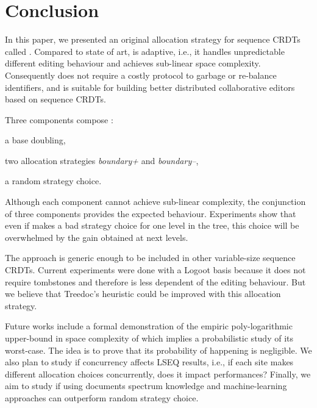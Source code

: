 \section{Conclusion}

In this paper, we presented an original allocation strategy for sequence CRDTs
called \NAME{}. Compared to state of art, \NAME{} is adaptive, i.e., it handles
unpredictable different editing behaviour and achieves sub-linear space
complexity. Consequently \NAME{} does not require a costly protocol to garbage
or re-balance identifiers, and is suitable for building better distributed
collaborative editors based on sequence CRDTs.

Three components compose \NAME{}:
\begin{inparaenum}[(1)]
  \item a base doubling,
  \item two allocation strategies \emph{boundary+} and \emph{boundary--},
  \item a random strategy choice.
\end{inparaenum}

Although each component cannot achieve sub-linear complexity, the conjunction
of three components provides the expected behaviour. Experiments show that
even if \NAME{} makes a bad strategy choice for one level in the tree, this
choice will be overwhelmed by the gain obtained at next levels.


The \NAME{} approach is generic enough to be included in other variable-size
sequence CRDTs. Current experiments were done with a Logoot basis because it
does not require tombstones and therefore is less dependent of the editing
behaviour. But we believe that Treedoc's heuristic could be improved with this
allocation strategy.

Future works include a formal demonstration of the empiric poly-logarithmic
upper-bound in space complexity of \NAME{} which implies a probabilistic study
of its worst-case. The idea is to prove that its probability of happening is
negligible. We also plan to study if concurrency affects LSEQ results, i.e., if
each site makes different allocation choices concurrently, does it impact
\NAME{} performances? Finally, we aim to study if using documents spectrum
knowledge and machine-learning approaches can outperform random strategy
choice.
